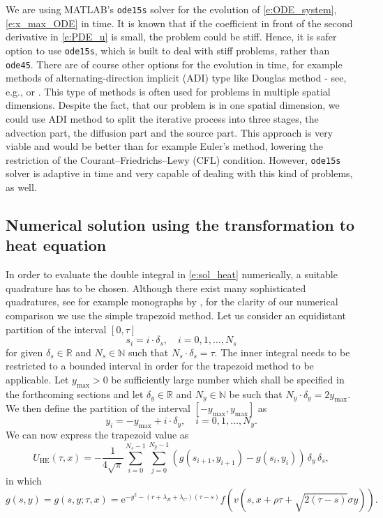\documentclass[a4paper,10pt]{article}
\newcommand{\e}{\mathrm{e}}
\newcommand{\1}{\mathbf{1}}
\begin{document}
{We are using MATLAB's \texttt{ode15s} solver for the evolution of \eqref{e:ODE_system}, \eqref{e:x_max_ODE} in time. It is known that if the coefficient in front of the second derivative in \eqref{e:PDE_u} is small, the problem could be stiff. Hence, it is safer option to use \texttt{ode15s}, which is built to deal with stiff problems, rather than \texttt{ode45}. There are of course other options for the evolution in time, for example methods of alternating-direction implicit (ADI) type like Douglas method - see, e.g., \cite[Chap. 10]{Rouah13} or \cite[Chap. 13]{Hout17}. This type of methods is often used for problems in multiple spatial dimensions. Despite the fact, that our problem is in one spatial dimension, we could use ADI method to split the iterative process into three stages, the advection part, the diffusion part and the source part. This approach is very viable and would be better than for example Euler's method, lowering the restriction of the Courant–Friedrichs–Lewy (CFL) condition. However, \texttt{ode15s} solver is adaptive in time and very capable of dealing with this kind of problems, as well.


\subsection{Numerical solution using the transformation to heat equation}
\label{sec:meth_HE}

In order to evaluate the double integral in \eqref{e:sol_heat} numerically, a suitable quadrature has to be chosen. Although there exist many sophisticated quadratures, see for example monographs by \citet{Krylov62,Stoer02,Davis07,Dahlquist08}, for the clarity of our numerical comparison we use the simple trapezoid method. Let us consider an equidistant partition of the interval $[0,\tau]$ 
\[ 
s_i = i \cdot \delta_s, \quad i= 0, 1, \ldots, N_s 
\]
for given $\delta_s \in \mathbb{R}$ and $N_s \in \mathbb{N}$ such that $N_s \cdot \delta_s = \tau$. 
The inner integral needs to be restricted to a bounded interval in order for the trapezoid method to be applicable. 
Let $y_{\max}>0$ be sufficiently large number which shall be specified in the forthcoming sections and let $\delta_y \in \mathbb{R}$ and $N_y \in \mathbb{N}$ be such that $N_y \cdot \delta_y = 2 y_{\max}$. We then define the partition of the interval $[-y_{\max},y_{\max}]$ as 
\[
y_i = -y_{\max} + i \cdot \delta_y, \quad i = 0,1,\ldots, N_y.
\]
We can now express the trapezoid value as 
\begin{equation} \label{e:HE_trap_integral}
U_{\text{HE}}(\tau,x) = -\frac{1}{4\sqrt{\pi}} \sum_{i=0}^{N_s-1} \sum_{j=0}^{N_y-1} (g(s_{i+1},y_{i+1})-g(s_i,y_i)) \, \delta_y \, \delta_s, 
\end{equation}
in which
\[
g(s,y)= g(s,y;\tau,x) = \e^{-y^2-(r+\lambda_B+\lambda_C)(\tau-s)} f(v(s,x+\rho \tau + \sqrt{2(\tau-s)}\sigma y)).
\]


}
\end{document}

